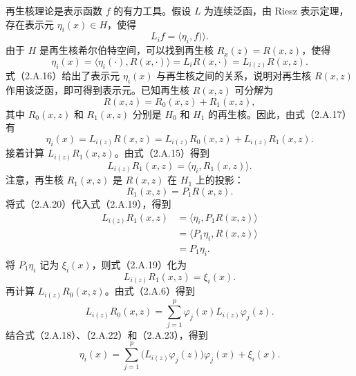 再生核理论是表示函数 $f$ 的有力工具。假设 $L$ 为连续泛函，由 Riesz 表示定理，存在表示元 $\eta_i(x)\in H$，使得
\begin{equation}
L_if=\langle\eta_i,f)\rangle.\tag{2.A.15}
\end{equation}
由于 $H$ 是再生核希尔伯特空间，可以找到再生核 $R_x(z)=R(x,z)$，使得
\begin{equation}
\eta_i(x)=\langle\eta_i(\cdot),R(x,\cdot)\rangle
 =L_iR(x,\cdot)=L_{i(z)}R(x,z).\tag{2.A.16}
\end{equation}
式（2.A.16）给出了表示元 $\eta_i(x)$ 与再生核之间的关系，说明对再生核 $R(x,z)$ 作用该泛函，即可得到表示元。已知再生核 $R(x,z)$ 可分解为
\begin{equation}
R(x,z)=R_0(x,z)+R_1(x,z),\tag{2.A.17}
\end{equation}
其中 $R_0(x,z)$ 和 $R_1(x,z)$ 分别是 $H_0$ 和 $H_1$ 的再生核。因此，由式（2.A.17）有
\begin{equation}
\eta_i(x)=L_{i(z)}R(x,z)
 =L_{i(z)}R_0(x,z)+L_{i(z)}R_1(x,z).\tag{2.A.18}
\end{equation}
接着计算 $L_{i(z)}R_1(x,z)$。由式（2.A.15）得到
\begin{equation}
L_{i(z)}R_1(x,z)=\langle\eta_i,R_1(x,z)\rangle.\tag{2.A.19}
\end{equation}
注意，再生核 $R_1(x,z)$ 是 $R(x,z)$ 在 $H_1$ 上的投影：
\begin{equation}
R_1(x,z)=P_1R(x,z).\tag{2.A.20}
\end{equation}
将式（2.A.20）代入式（2.A.19），得到
\begin{equation}
\begin{aligned}
L_{i(z)}R_1(x,z)&=\langle\eta_i,P_1R(x,z)\rangle\\
 &=\langle P_1\eta_i,R(x,z)\rangle\\
 &=P_1\eta_i.
\end{aligned}\tag{2.A.21}
\end{equation}
将 $P_1\eta_i$ 记为 $\xi_i(x)$，则式（2.A.19）化为
\begin{equation}
L_{i(z)}R_1(x,z)=\xi_i(x).\tag{2.A.22}
\end{equation}
再计算 $L_{i(z)}R_0(x,z)$。由式（2.A.6）得到
\begin{equation}
L_{i(z)}R_0(x,z)=\sum_{j=1}^p\varphi_j(x)L_{i(z)}\varphi_j(z).\tag{2.A.23}
\end{equation}
结合式（2.A.18）、（2.A.22）和（2.A.23），得到
\begin{equation}
\eta_i(x)=\sum_{j=1}^p\bigl(L_{i(z)}\varphi_j(z)\bigr)\varphi_j(x)+\xi_i(x).\tag{2.A.24}
\end{equation}
